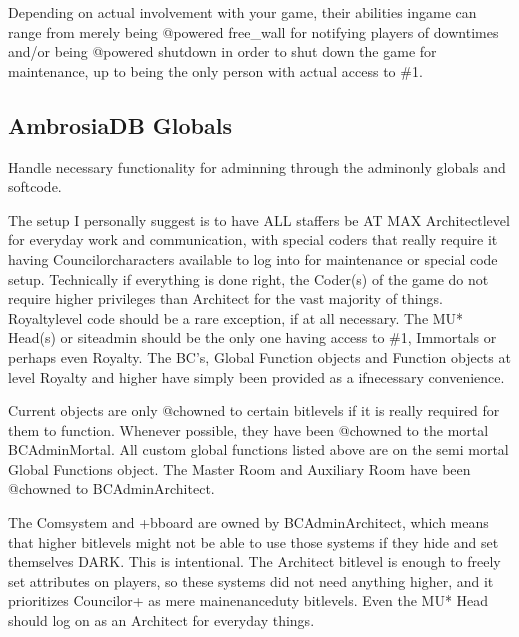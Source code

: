 \documentclass[letterpaper,10pt,english]{sphinxmanual}
\begin{document}
\sphinxAtStartPar
Depending on actual involvement with your game, their abilities
in\sphinxhyphen{}game can range from merely being @powered free\_wall for
notifying players of downtimes and/or being @powered shutdown in
order to shut down the game for maintenance, up to being the
only person with actual access to \#1.


\subsection{AmbrosiaDB Globals}
\label{\detokenize{ambrosiadb:ambrosiadb-globals}}
\sphinxAtStartPar
Handle necessary functionality for adminning through the admin\sphinxhyphen{}only globals and
softcode.

\sphinxAtStartPar
The setup I personally suggest is to have ALL staffers be AT MAX Architect\sphinxhyphen{}level
for everyday work and communication, with special coders that \sphinxhyphen{}really\sphinxhyphen{} require
it having Councilor\sphinxhyphen{}characters available to log into for maintenance or special
code setup. Technically if everything is done right, the Coder(s) of the game do
not require higher privileges than Architect for the vast majority of things.
Royalty\sphinxhyphen{}level code should be a rare exception, if at all necessary. The MU*
Head(s) or site\sphinxhyphen{}admin should be the only one having access to \#1, Immortals or
perhaps even Royalty. The BC’s, Global Function objects and Function objects at
level Royalty and higher have simply been provided as a if\sphinxhyphen{}necessary convenience.

\sphinxAtStartPar
Current objects are only @chowned to certain bitlevels if it is really required
for them to function. Whenever possible, they have been @chowned to the mortal
BC\sphinxhyphen{}Admin\sphinxhyphen{}Mortal. All custom global functions listed above are on the semi\sphinxhyphen{}
\sphinxhyphen{}mortal Global Functions object. The Master Room and Auxiliary Room have been
@chowned to BC\sphinxhyphen{}Admin\sphinxhyphen{}Architect.

\sphinxAtStartPar
The Comsystem and +bboard are owned by BC\sphinxhyphen{}Admin\sphinxhyphen{}Architect, which means that
higher bitlevels might not be able to use those systems if they hide and set
themselves DARK. This is intentional. The Architect bitlevel is enough to freely
set attributes on players, so these systems did not need anything higher, and
it prioritizes Councilor+ as mere mainenance\sphinxhyphen{}duty bitlevels. Even the MU* Head
should log on as an Architect for everyday things.
\end{document}
